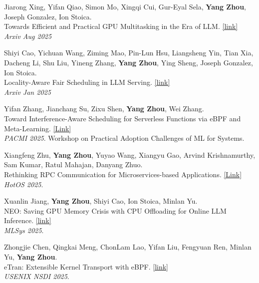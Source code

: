 \documentclass[letterpaper, 11pt]{article}
\newcounter{mySaveCounter}
\newenvironment{myEnumerateCitation}{%
  \begin{enumerate}[label={[\arabic*]},ref={[\arabic*]}]
    \usecounter{enumi}%
    \setcounter{enumi}{\value{mySaveCounter}}
    \setlength{\itemsep}{0pt}%
    \setlength{\parskip}{5pt}%
}
{%
  \setcounter{mySaveCounter}{\value{enumi}}\end{enumerate}%
}
\begin{document}
\begin{myEnumerateCitation}

\item Jiarong Xing, Yifan Qiao, Simon Mo, Xingqi Cui, Gur-Eyal Sela, \textbf{Yang Zhou}, Joseph Gonzalez, Ion Stoica.
\\Towards Efficient and Practical GPU Multitasking in the Era of LLM. \href{https://arxiv.org/pdf/2508.08448}{[link]}
\\\textit{Arxiv Aug 2025}

\item Shiyi Cao\*, Yichuan Wang\*, Ziming Mao, Pin-Lun Hsu, Liangsheng Yin, Tian Xia, Dacheng Li, Shu Liu, Yineng Zhang, \textbf{Yang Zhou}, Ying Sheng, Joseph Gonzalez, Ion Stoica.
\\Locality-Aware Fair Scheduling in LLM Serving. \href{https://arxiv.org/pdf/2501.14312}{[link]}
\\\textit{Arxiv Jan 2025}

\item Yifan Zhang, Jianchang Su, Zixu Shen, \textbf{Yang Zhou}, Wei Zhang.
\\Toward Interference-Aware Scheduling for Serverless Functions via eBPF and Meta-Learning. \href{https://dl.acm.org/doi/epdf/10.1145/3766882.3767181}{[Link]}
\\\textit{PACMI 2025}. Workshop on Practical Adoption Challenges of ML for Systems.

\item Xiangfeng Zhu, \textbf{Yang Zhou}, Yuyao Wang, Xiangyu Gao, Arvind Krishnamurthy, Sam Kumar, Ratul Mahajan, Danyang Zhuo. 
\\Rethinking RPC Communication for Microservices-based Applications. \href{https://sigops.org/s/conferences/hotos/2025/papers/hotos25-71.pdf}{[Link]}
\\\textit{HotOS 2025}.

\item Xuanlin Jiang, \textbf{Yang Zhou}, Shiyi Cao, Ion Stoica, Minlan Yu. 
\\NEO: Saving GPU Memory Crisis with CPU Offloading for Online LLM Inference. \href{https://proceedings.mlsys.org/paper_files/paper/2025/file/66a026c0d17040889b50f0dfa650e5e0-Paper-Conference.pdf}{[link]}
\\\textit{MLSys 2025}.

\item Zhongjie Chen, Qingkai Meng, ChonLam Lao, Yifan Liu, Fengyuan Ren, Minlan Yu, \textbf{Yang Zhou}. 
\\eTran: Extensible Kernel Transport with eBPF. \href{https://www.usenix.org/system/files/nsdi25-chen-zhongjie.pdf}{[link]}
\\\textit{USENIX NSDI 2025}.

\end{myEnumerateCitation}
\end{document}
